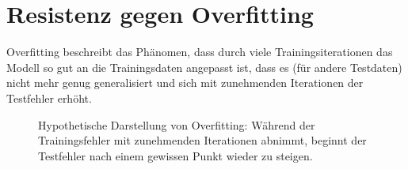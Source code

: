 \section{Resistenz gegen Overfitting}
Overfitting beschreibt das Phänomen, dass durch viele Trainingsiterationen das Modell so gut an die Trainingsdaten angepasst ist, dass es (für andere Testdaten) nicht mehr genug generalisiert und sich mit zunehmenden Iterationen der Testfehler erhöht.

\begin{figure}[H]
    \centering
    \caption[Hypothetische Darstellung von Overfitting]{Hypothetische Darstellung von Overfitting: Während der Trainingsfehler mit zunehmenden Iterationen abnimmt, beginnt der Testfehler nach einem gewissen Punkt wieder zu steigen.}
\end{figure}


